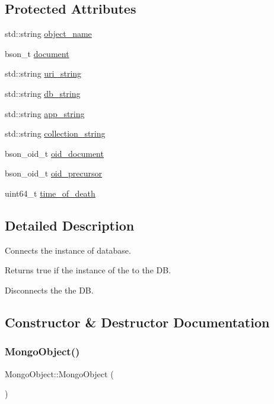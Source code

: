 \subsection*{Protected Attributes}
\begin{DoxyCompactItemize}
\item 
std\+::string \hyperlink{class_mongo_object_a451655d98b9b515d856f7178b46e4b01}{object\+\_\+name}
\item 
bson\+\_\+t \hyperlink{class_mongo_object_aa143fbe117d6c12baf222be25555947b}{document}
\item 
std\+::string \hyperlink{class_mongo_object_a71e3fa5196ad3b496d0aa326d61e84e8}{uri\+\_\+string}
\item 
std\+::string \hyperlink{class_mongo_object_a215dc4379af5ac81e19d245f5d5d37e0}{db\+\_\+string}
\item 
std\+::string \hyperlink{class_mongo_object_ace5148b45dd674c73077a044d0233ed8}{app\+\_\+string}
\item 
std\+::string \hyperlink{class_mongo_object_a59d2d926fd2f8048b1dab88b3e1fea5b}{collection\+\_\+string}
\item 
bson\+\_\+oid\+\_\+t \hyperlink{class_mongo_object_a020a40224a752e6036d49ec22474d616}{oid\+\_\+document}
\item 
bson\+\_\+oid\+\_\+t \hyperlink{class_mongo_object_a4905c165b7b18f471ee56f8eb3f5e0f1}{oid\+\_\+precursor}
\item 
uint64\+\_\+t \hyperlink{class_mongo_object_a0ced4ff82fbee4e7213715994d690380}{time\+\_\+of\+\_\+death}
\end{DoxyCompactItemize}


\subsection{Detailed Description}
Connects the instance of database. 

Returns true if the instance of the to the DB.

Disconnects the the DB. 

\subsection{Constructor \& Destructor Documentation}
\mbox{\label{class_mongo_object_ae0438efeae33db2bfeb3972e1196a8a9}} 
\subsubsection{\texorpdfstring{Mongo\+Object()}{MongoObject()}\hspace{0.1cm}{\footnotesize\ttfamily [1/2]}}
{\footnotesize\ttfamily Mongo\+Object\+::\+Mongo\+Object (\begin{DoxyParamCaption}{ }\end{DoxyParamCaption})}

